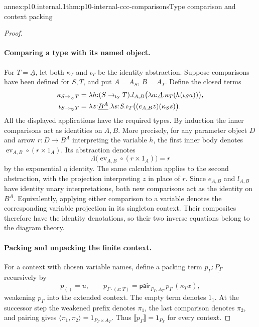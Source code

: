 \begin{annexitem}{annex:p10.internal.1}{thm:p10-internal-ccc-comparisons}{Type comparison and context packing}
\begin{proof}
\paragraph{Comparing a type with its named object.}
For \(T=\underline A\), let both \(\kappa_T\) and \(\iota_T\)
be the identity abstraction.
Suppose comparisons have been defined for \(S,T\), and put
\(A=A_S\), \(B=A_T\).  Define the closed terms
\[
\begin{aligned}
 \kappa_{S\to_{\rm ty}T}
  &=\lambda h{:}(S\to_{\rm ty}T).
      l_{A,B}\bigl(\lambda a{:}\underline A.
                        \kappa_T(h(\iota_Sa))\bigr),\\
 \iota_{S\to_{\rm ty}T}
  &=\lambda z{:}\underline{B^A}.\lambda s{:}S.
                   \iota_T\bigl((e_{A,B}z)(\kappa_Ss)\bigr).
\end{aligned}
\]
All the displayed applications have the required types.
By induction the inner comparisons act as identities on \(A,B\).
More precisely, for any parameter object \(D\) and arrow
\(r:D\to B^A\) interpreting the variable \(h\), the first inner
body denotes \(\operatorname{ev}_{A,B}\circ(r\times1_A)\).
Its abstraction denotes
\[
 \Lambda\bigl(\operatorname{ev}_{A,B}\circ(r\times1_A)\bigr)=r
\]
by the exponential \(\eta\) identity.
The same calculation applies to the second abstraction, with the
projection interpreting \(z\) in place of \(r\).
Since \(e_{A,B}\) and \(l_{A,B}\) have identity unary interpretations,
both new comparisons act as the identity on \(B^A\).
Equivalently, applying either comparison to a variable denotes the
corresponding variable projection in its singleton context.
Their composites therefore have the identity denotations, so their
two inverse equations belong to the diagram theory.

\paragraph{Packing and unpacking the finite context.}
For a context with chosen variable names, define a packing term
\(p_\Gamma:\underline{P_\Gamma}\) recursively by
\[
 p_{()}=u,\qquad
 p_{\Gamma\cdot(x{:}T)}
   =\mathsf{pair}_{P_\Gamma,A_T}\,p_\Gamma\,(\kappa_Tx),
\]
weakening \(p_\Gamma\) into the extended context.
The empty term denotes \(1_1\).
At the successor step the weakened prefix denotes \(\pi_1\), the
last comparison denotes \(\pi_2\), and pairing gives
\(\langle\pi_1,\pi_2\rangle=1_{P_\Gamma\times A_T}\).
Thus \(\llbracket p_\Gamma\rrbracket=1_{P_\Gamma}\) for every context.


\end{proof}
\end{annexitem}
